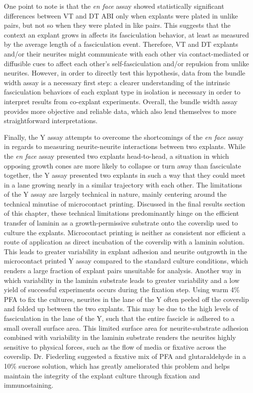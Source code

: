 One point to note is that the \emph{en face} assay showed statistically significant differences between VT and DT ABI only when explants were plated in unlike pairs, but not so when they were plated in like pairs.
This suggests that the context an explant grows in affects its fasciculation behavior, at least as measured by the average length of a fasciculation event.
Therefore, VT and DT explants and/or their neurites might communicate with each other via contact-mediated or diffusible cues to affect each other's self-fasciculation and/or repulsion from unlike neurites.
However, in order to directly test this hypothesis, data from the bundle width assay is a necessary first step: a clearer understanding of the intrinsic fasciculation behaviors of each explant type in isolation is necessary in order to interpret results from co-explant experiments.
Overall, the bundle width assay provides more objective and reliable data, which also lend themselves to more straightforward interpretations.

Finally, the Y assay attempts to overcome the shortcomings of the \emph{en face} assay in regards to measuring neurite-neurite interactions between two explants.
While the \emph{en face} assay presented two explants head-to-head, a situation in which opposing growth cones are more likely to collapse or turn away than fasciculate together, the Y assay presented two explants in such a way that they could meet in a lane growing nearly in a similar trajectory with each other.
The limitations of the Y assay are largely technical in nature, mainly centering around the technical minutiae of microcontact printing.
Discussed in the final results section of this chapter, these technical limitations predominantly hinge on the efficient transfer of laminin as a growth-permissive substrate onto the coverslip used to culture the explants.
Microcontact printing is neither as consistent nor efficient a route of application as direct incubation of the coverslip with a laminin solution.
This leads to greater variability in explant adhesion and neurite outgrowth in the microcontact printed Y assay compared to the standard culture conditions, which renders a large fraction of explant pairs unsuitable for analysis.
Another way in which variability in the laminin substrate leads to greater variability and a low yield of successful experiments occurs during the fixation step.
Using warm 4\% PFA to fix the cultures, neurites in the lane of the Y often peeled off the coverslip and folded up between the two explants.
This may be due to the high levels of fasciculation in the lane of the Y, such that the entire fascicle is adhered to a small overall surface area.
This limited surface area for neurite-substrate adhesion combined with variability in the laminin substrate renders the neurites highly sensitive to physical forces, such as the flow of media or fixative across the coverslip.
Dr. Fiederling suggested a fixative mix of PFA and glutaraldehyde in a 10\% sucrose solution, which has greatly ameliorated this problem and helps maintain the integrity of the explant culture through fixation and immunostaining.


